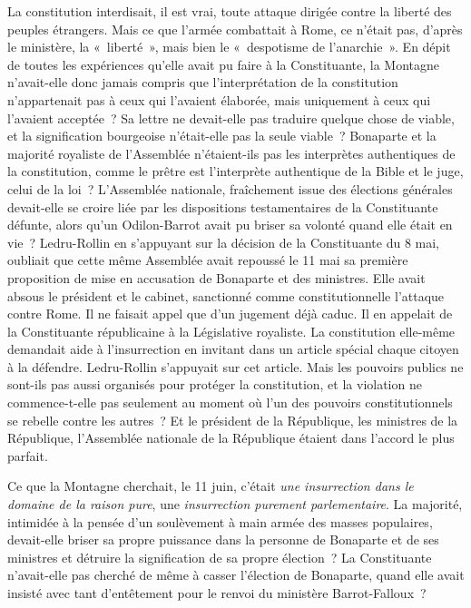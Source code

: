 \documentclass[twoside]{book} %
\begin{document}
La constitution interdisait, il est vrai, toute attaque dirigée contre la liberté des peuples étrangers. Mais ce que l’armée combattait à Rome, ce n’était pas, d’après le ministère, la « liberté », mais bien le « despotisme de l’anarchie ». En dépit de toutes les expériences qu’elle avait pu faire à la Constituante, la Montagne n’avait-elle donc jamais compris que l’interprétation de la constitution n’appartenait pas à ceux qui l’avaient élaborée, mais uniquement à ceux qui l’avaient acceptée ? Sa lettre ne devait-elle pas traduire quelque chose de viable, et la signification bourgeoise n’était-elle pas la seule viable ? Bonaparte et la majorité royaliste de l’Assemblée n’étaient-ils pas les interprètes authentiques de la constitution, comme le prêtre est l’interprète authentique de la Bible et le juge, celui de la loi ? L’Assemblée nationale, fraîchement issue des élections générales devait-elle se croire liée par les dispositions testamentaires de la Constituante défunte, alors qu’un Odilon-Barrot avait pu briser sa volonté quand elle était en vie ? Ledru-Rollin en s’appuyant sur la décision de la Constituante du 8 mai, oubliait que cette même Assemblée avait repoussé le 11 mai sa première proposition de mise en accusation de Bonaparte et des ministres. Elle avait absous le président et le cabinet, sanctionné comme constitutionnelle l’attaque contre Rome. Il ne faisait appel que d’un jugement déjà caduc. Il en appelait de la Constituante républicaine à la Législative royaliste. La constitution elle-même demandait aide à l’insurrection en invitant dans un article spécial chaque citoyen à la défendre. Ledru-Rollin s’appuyait sur cet article. Mais les pouvoirs publics ne sont-ils pas aussi organisés pour protéger la constitution, et la violation ne commence-t-elle pas seulement au moment où l’un des pouvoirs constitutionnels se rebelle contre les autres ? Et le président de la République, les ministres de la République, l’Assemblée nationale de la République étaient dans l’accord le plus parfait.\par
Ce que la Montagne cherchait, le 11 juin, c’était \emph{une insurrection dans le domaine de la raison pure}, une \emph{insurrection purement parlementaire}. La majorité, intimidée à la pensée d’un soulèvement à main armée des masses populaires, devait-elle briser sa propre puissance dans la personne de Bonaparte et de ses ministres et détruire la signification de sa propre élection ? La Constituante n’avait-elle pas cherché de même à casser l’élection de Bonaparte, quand elle avait insisté avec tant d’entêtement pour le renvoi du ministère Barrot-Falloux ?\par
\end{document}
